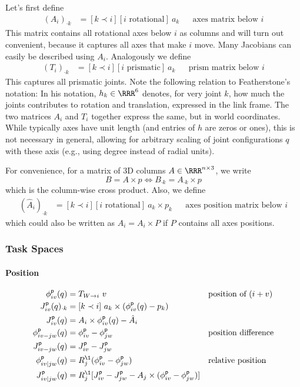 \documentclass[10pt,fleqn,twoside]{article}
\newcommand{\pos}{{\textsf{p}}}
\newcommand{\TR}[2]{T_{{#1}\rightarrow{#2}}}
\begin{document}
{{Let's first define
\begin{align}
(A_i)_{\cdot k}
&= [k \prec i] [\text{$i$ rotational}]~ a_k && \text{axes matrix below $i$}
\end{align}
This matrix contains all rotational axes below $i$ as columns and will
turn out convenient, because it captures all axes that make $i$
move. Many Jacobians can easily be described using $A_i$. Analogously
we define
\begin{align}
(T_i)_{\cdot k}
&= [k \prec i] [\text{$i$ prismatic}]~ a_k && \text{prism matrix below $i$}
\end{align}
This captures all prismatic joints. Note the following relation to
Featherstone's notation: In his notation, $h_k\in\RRR^6$ denotes, for
very joint $k$, how much the joints contributes to rotation and translation,
expressed in the link frame. The two matrices $A_i$ and $T_i$ together
express the same, but in world coordinates. While typically axes have
unit length (and entries of $h$ are zeros or ones), this is not necessary
in general, allowing for arbitrary scaling of joint configurations $q$
with these axis (e.g., using degree instead of radial units).

For convenience, for a matrix of 3D columns $A\in\RRR^{n\times 3}$, we write
$$B = A\times p \iff B_{\cdot k} = A_{\cdot k} \times p$$
which is the column-wise cross product. Also, we define
\begin{align}
(\hat A_i)_{\cdot k}
&= [k \prec i] [\text{$i$ rotational}]~ a_k \times p_k && \text{axes
    position matrix below $i$}
\end{align}
which could also be written as $\hat A_i = A_i \times P$ if $P$
contains all axes positions.

\subsubsection{Task Spaces}

\paragraph{Position}

\begin{align}
\phi^\pos_{iv}(q)
 &= \TR{W}{i}~ v
 && \text{position of $(i+v)$} \\
J^\pos_{iv}(q)_{\cdot k}
 &= [k\prec i]~ a_k \times(\phi^\pos_{iv}(q) - p_k) \\
J^\pos_{iv}(q)
 &= A_i \times \phi^\pos_{iv}(q) - \hat A_i \\
\phi^\pos_{iv-jw}(q)
 &= \phi^\pos_{iv} - \phi^\pos_{jw}
 && \text{position difference} \\
J^\pos_{iv-jw}(q)
 & = J^\pos_{iv} - J^\pos_{jw} \\
\phi^\pos_{iv|jw}(q)
 & = R_j^\1 (\phi^\pos_{iv} - \phi^\pos_{jw})
 && \text{relative position} \\
J^\pos_{iv|jw}(q)
 & = R_j^\1 [J^\pos_{iv}-J^\pos_{jw} - A_j \times (\phi^\pos_{iv} - \phi^\pos_{jw})]
\end{align}

}}
\end{document}
